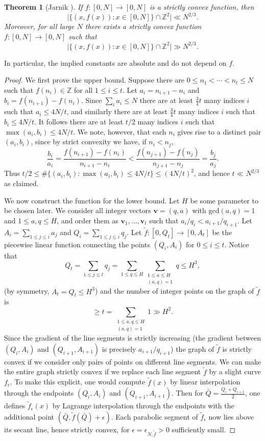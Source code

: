 \documentclass[12pt]{amsart}
\newcommand{\1}{{\mathbf 1}}
\newcommand{\eps}{{\epsilon}}
\newtheorem{theorem}{Theorem}
\theoremstyle{remark}
\theoremstyle{definition}
\begin{document}
\begin{theorem}[Jarnik \cite{Ja26}]

If $f:[0,N]\to [0,N]$ is a strictly convex function, then
\[\lvert \{ (x,f(x)) : x\in [0,N]\}\cap \mathbb{Z}^2\rvert \ll N^{2/3}.\]
Moreover, for all large $N$ there exists a strictly convex function $f:[0,N]\to[0,N]$ such that
\[\lvert \{ (x,f(x)) : x\in [0,N]\}\cap \mathbb{Z}^2\rvert \gg N^{2/3}.\]
\end{theorem}
In particular, the implied constants are absolute and do not depend on $f$.
\begin{proof}
We first prove the upper bound. Suppose there are $0\leq n_1<\cdots <n_t\leq N$ such that $f(n_i)\in \mathbb{Z}$ for all $1\leq i\leq t$. Let $a_i=n_{i+1}-n_i$ and $b_i=f(n_{i+1})-f(n_i)$. Since $\sum_i a_i\leq N$ there are at least $\frac{3}{4}t$ many indices $i$ such that $a_i \leq 4N/t$, and similarly there are at least $\frac{3}{4}t$ many indices $i$ such that $b_i\leq 4N/t$. It follows there are at least $t/2$ many indices $i$ such that $\max(a_i,b_i)\leq 4N/t$. We note, however, that each $n_i$ gives rise to a distinct pair $(a_i,b_i)$, since by strict convexity we have, if $n_i<n_j$,
\[\frac{b_i}{a_i}=\frac{f(n_{i+1})-f(n_i)}{n_{i+1}-n_i}< \frac{f(n_{j+1})-f(n_j)}{n_{j+1}-n_j}=\frac{b_j}{a_j}.\]
Thus $t/2 \le \#\{(a_i,b_i) : \max(a_i,b_i)\leq 4N/t\} \le (4N/t)^2$, and hence $t\ll N^{2/3}$ as claimed.

We now construct the function for the lower bound. Let $H$ be some parameter to be chosen later. We consider all integer vectors $\mathbf{v}=(q,a)$ with $\mathrm{gcd}(a,q)=1$ and $1\leq a,q\leq H$, and order them as $\mathbf{v}_1,\ldots,\mathbf{v}_t$ such that $a_i/q_i<a_{i+1}/q_{i+1}$. Let $A_i=\sum_{1\leq j\leq i}a_j$ and $Q_i=\sum_{1\leq j\leq i}q_j$. Let $\tilde{f}:[0,Q_t]\to [0,A_t]$ be the piecewise linear function connecting the points $(Q_i,A_i)$ for $0\leq i\leq t$. Notice that 
\[Q_t=\sum_{1\le j\le t}q_j=\sum_{1\le q\le H}\sum_{\substack{1\leq a\leq H\\ (a,q)=1}}q \leq H^3,\]
(by symmetry, $A_t=Q_t\le H^3$) and the number of integer points on the graph of $\tilde{f}$ is
\[\geq t= \sum_{\substack{1\leq a,q\leq H\\ (a,q)=1}}1\gg H^2.\]
Since the gradient of the line segments is strictly increasing (the gradient between $(Q_i,A_i)$ and $(Q_{i+1},A_{i+1})$ is precisely $a_{i+1}/q_{i+1}$) the graph of $\tilde{f}$ is strictly convex if we consider only pairs of points on different line segments. We can make the entire graph strictly convex if we replace each line segment $\tilde f$ by a slight curve $f_\eps$. To make this explicit, one would compute $\tilde f(x)$ by linear interpolation through the endpoints $(Q_i, A_i)$ and $(Q_{i+1}, A_{i+1})$. Then for $\bar Q=\frac{Q_i + Q_{i+1}}{2}$, one defines $\tilde f_\eps (x)$ by Lagrange interpolation through the endpoints with the additional point $(\bar Q, \tilde f(\bar Q) + \eps)$. Each parabolic segment of $\tilde f_\eps$ now lies above its secant line, hence strictly convex, for $\eps=\eps_{N,\tilde f}>0$ sufficiently small.


\end{proof}
\end{document}
